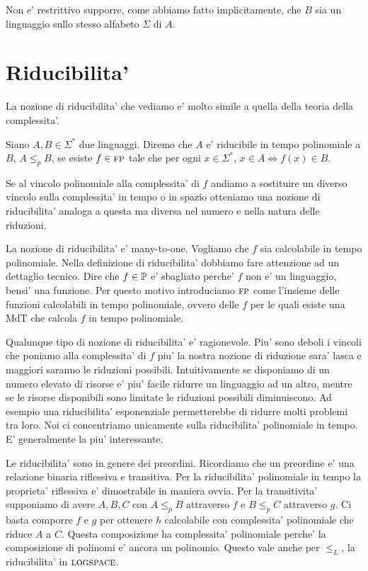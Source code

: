 Non e' restrittivo supporre, come abbiamo fatto implicitamente, che $B$ sia un linguaggio sullo
stesso alfabeto $\Sigma$ di $A$.

\section{Riducibilita'}


La nozione di riducibilita' che vediamo e' molto simile a quella della teoria della complessita'.

\begin{defn}
    Siano $A,B \in \Sigma^{*}$ due linguaggi. Diremo che $A$ e' riducibile in tempo polinomiale a
    $B$, $A \leq_{p} B$, se esiste $f \in \textsc{fp}$ tale che per ogni $x \in \Sigma^{*}$, $x \in A \iff
    f(x) \in B$.
\end{defn}
Se al vincolo polinomiale alla complessita' di $f$ andiamo a sostituire un diverso vincolo sulla
complessita' in tempo o in spazio otteniamo una nozione di riducibilita' analoga a questa ma diversa
nel numero e nella natura delle riduzioni.

La nozione di riducibilita' e' many-to-one. Vogliamo che $f$ sia calcolabile in tempo polinomiale.
Nella definizione di riducibilita' dobbiamo fare attenzione ad un dettaglio tecnico.  Dire che $f
\in \mathbb{P}$ e' sbagliato perche' $f$ non e' un linguaggio, bensi' una funzione. Per questo motivo
introduciamo $\textsc{fp}$ come l'insieme delle funzioni calcolabili in tempo polinomiale, ovvero delle $f$
per le quali esiste una MdT che calcola $f$ in tempo polinomiale.

Qualunque tipo di nozione di riducibilita' e' ragionevole. Piu' sono deboli i vincoli che poniamo
alla complessita' di $f$ piu' la nostra nozione di riduzione sara' lasca e maggiori saranno le
riduzioni possibili. Intuitivamente se disponiamo di un numero elevato di risorse e' piu' facile
ridurre un linguaggio ad un altro, mentre se le risorse disponibili sono limitate le riduzioni
possibili diminuiscono. Ad esempio una riducibilita' esponenziale permetterebbe di ridurre molti
problemi tra loro. Noi ci concentriamo unicamente sulla riducibilita' polinomiale in tempo. E'
generalmente la piu' interessante.

Le riducibilita' sono in genere dei preordini. Ricordiamo che un preordine e' una relazione binaria
riflessiva e transitiva. Per la riducibilita' polinomiale in tempo la proprieta' riflessiva e'
dimostrabile in maniera ovvia. Per la transitivita' supponiamo di avere $A,B,C$ con $A \leq_{p} B$
attraverso $f$ e $B \leq_{p} C$ attraverso $g$. Ci basta comporre $f$ e $g$ per ottenere $h$
calcolabile con complessita' polinomiale che riduce $A$ a $C$. Questa composizione ha complessita'
polinomiale perche' la composizione di polinomi e' ancora un polinomio. Questo vale anche per
$\leq_{L}$, la riducibilita' in $\textsc{logspace}$.

